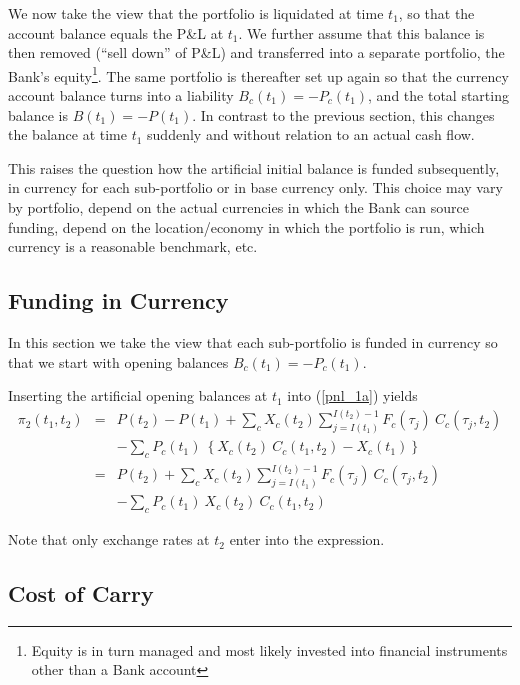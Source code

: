 \bigskip
We now take the view that the portfolio is liquidated at time $t_1$, so that the account balance equals the P\&L at $t_1$. We further assume that this balance is then removed (``sell down'' of P\&L) and transferred into a separate portfolio, the Bank's equity\footnote{Equity is in turn managed and most likely invested into financial instruments other than a Bank account}. The same portfolio is thereafter set up again so that the currency account balance turns into a liability $B_c(t_1) = - P_c(t_1)$, and the total starting balance is $B(t_1)=-P(t_1)$. In contrast to the previous section, this changes the balance at time $t_1$ suddenly and without relation to an actual cash flow.

This raises the question how the artificial initial balance is funded subsequently, in currency for each sub-portfolio or in base currency only. This
choice may vary by portfolio, depend on the actual currencies in which the Bank can source funding, depend on the location/economy in which the portfolio is run, which currency is a reasonable benchmark, etc.

\subsection*{Funding in Currency}\label{funding_ccy}

In this section we take the view that each sub-portfolio is funded in currency
so that we start with opening balances $B_c(t_1) = -P_c(t_1)$.

Inserting the artificial opening balances at $t_1$ into (\ref{pnl_1a}) yields
\begin{eqnarray}
	\pi_2(t_1, t_2) &=& P(t_2) - P(t_1)
	+ \sum_c X_c(t_2) \sum_{j=I(t_1)}^{I(t_2)-1}F_c(\tau_j)\:C_c(\tau_j, t_2)
	\nonumber\\
	&& - \sum_c P_c(t_1)\:\left\{X_c(t_2)\:C_c(t_1, t_2) - X_c(t_1)\right\} \nonumber \\
&=&	P(t_2)
	+ \sum_c X_c(t_2) \sum_{j=I(t_1)}^{I(t_2)-1}F_c(\tau_j)\:C_c(\tau_j, t_2)
	\nonumber\\
	&& - \sum_c P_c(t_1)\:X_c(t_2)\:C_c(t_1, t_2)
	\label{pnl_2}
\end{eqnarray}

Note that only exchange rates at $t_2$ enter into the expression.

\subsection*{Cost of Carry}

